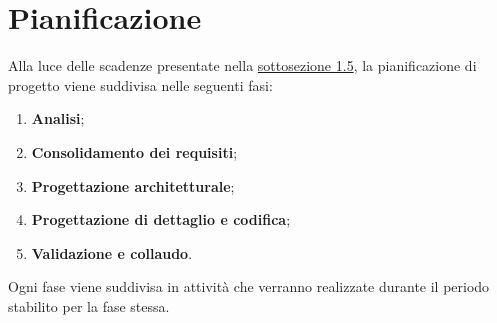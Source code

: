 \section{Pianificazione}
Alla luce delle scadenze presentate nella \hyperlink{scadenze}{sottosezione 1.5}, la pianificazione di progetto viene suddivisa nelle seguenti fasi:
\begin{enumerate}
	\item \textbf{Analisi};
	\item \textbf{Consolidamento dei requisiti};
	\item \textbf{Progettazione architetturale};
	\item \textbf{Progettazione di dettaglio e codifica};
	\item \textbf{Validazione e collaudo}.
\end{enumerate}
Ogni fase viene suddivisa in attività che verranno realizzate durante il 
periodo stabilito per la fase stessa. 
